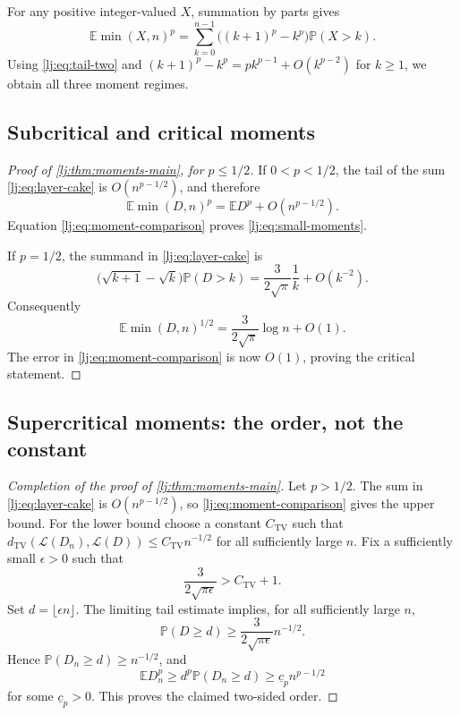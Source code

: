 \documentclass[11pt,a4paper]{article}
\theoremstyle{definition}\newaliascnt{definition}{theorem}
\theoremstyle{remark}\newaliascnt{remark}{theorem}
\newcommand{\ljP}{\mathbb P}
\newcommand{\ljE}{\mathbb E}
\newcommand{\ljTV}{d_{\mathrm{TV}}}
\newcommand{\ljLaw}{\mathcal L}
\begin{document}
For any positive integer-valued $X$, summation by parts gives
\begin{equation}
 \ljE\min(X,n)^p
 =\sum_{k=0}^{n-1}\bigl((k+1)^p-k^p\bigr)\ljP(X>k).
 \label{lj:eq:layer-cake}
\end{equation}
Using \eqref{lj:eq:tail-two} and
$(k+1)^p-k^p=pk^{p-1}+O(k^{p-2})$ for $k\ge1$,
we obtain all three moment regimes.

\subsection{Subcritical and critical moments}
\begin{proof}[Proof of \cref{lj:thm:moments-main}, for $p\le1/2$]
If $0<p<1/2$, the tail of the sum \eqref{lj:eq:layer-cake} is
$O(n^{p-1/2})$, and therefore
\[
 \ljE\min(D,n)^p=\ljE D^p+O(n^{p-1/2}).
\]
Equation \eqref{lj:eq:moment-comparison} proves
\eqref{lj:eq:small-moments}.

If $p=1/2$, the summand in \eqref{lj:eq:layer-cake} is
\[
 \bigl(\sqrt{k+1}-\sqrt k\bigr)\ljP(D>k)
 =\frac3{2\sqrt\pi}\frac1k+O(k^{-2}).
\]
Consequently
\[
 \ljE\min(D,n)^{1/2}
 =\frac3{2\sqrt\pi}\log n+O(1).
\]
The error in \eqref{lj:eq:moment-comparison} is now $O(1)$, proving the
critical statement.
\end{proof}

\subsection{Supercritical moments: the order, not the constant}
\begin{proof}[Completion of the proof of \cref{lj:thm:moments-main}]
Let $p>1/2$. The sum in \eqref{lj:eq:layer-cake} is
$O(n^{p-1/2})$, so \eqref{lj:eq:moment-comparison} gives the upper bound.
For the lower bound choose a constant $C_{\mathrm{TV}}$ such that
$\ljTV(\ljLaw(D_n),\ljLaw(D))\le C_{\mathrm{TV}}n^{-1/2}$ for all sufficiently large $n$.
Fix a sufficiently small $\epsilon>0$ such that
\[
 \frac3{2\sqrt{\pi\epsilon}}>C_{\mathrm{TV}}+1.
\]
Set $d=\lfloor\epsilon n\rfloor$. The limiting tail estimate implies,
for all sufficiently large $n$,
\[
 \ljP(D\ge d)\ge
 \frac3{2\sqrt{\pi\epsilon}}n^{-1/2}.
\]
Hence $\ljP(D_n\ge d)\ge n^{-1/2}$, and
\[
 \ljE D_n^p\ge d^p\ljP(D_n\ge d)
 \ge \underline c_p n^{p-1/2}
\]
for some $\underline c_p>0$. This proves the claimed two-sided order.
\end{proof}
\end{document}
